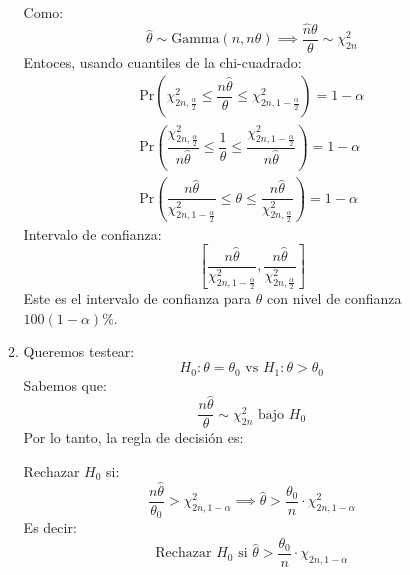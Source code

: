 \begin{enumerate}[label=\color{red}\textbf{\arabic*)}]
\begin{enumerate}[label=\color{red}\textbf{\alph*)}]
            Como: \[
            \hat{\theta}\sim \text{Gamma}(n,n\theta)\implies \dfrac{\hat{n}\theta}{\theta}\sim \chi_{2n}^2
            \] 
            Entoces, usando cuantiles de la chi-cuadrado: \[
\begin{array}{c}
            \mathrm{Pr}\left( \chi_{2n,\frac{\alpha}{2} }^2\le \dfrac{n \hat{\theta}}{\theta}\le \chi_{2n,1-\frac{\alpha}{2} }^2 \right) =1-\alpha\\
            \mathrm{Pr}\left( \dfrac{\chi_{2n,\frac{\alpha}{2} }^2}{n \hat{\theta}}\le \dfrac{1}{\theta}\le \dfrac{\chi_{2n,1-\frac{\alpha}{2} }^2}{n \hat{\theta}} \right) =1-\alpha\\
            \mathrm{Pr}\left( \dfrac{n \hat{\theta}}{\chi_{2n,1-\frac{\alpha}{2}}^2} \le \theta\le \dfrac{n \hat{\theta}}{\chi_{2n,\frac{\alpha}{2} }^2} \right) =1-\alpha
\end{array}
            \] 
            Intervalo de confianza: \[
            \left[ \dfrac{n \hat{\theta}}{\chi_{2n,1-\frac{\alpha}{2}}^2},\dfrac{n \hat{\theta}}{\chi_{2n,\frac{\alpha}{2}}^2} \right] 
            \] 
            Este es el intervalo de confianza para $\theta$ con nivel de confianza  $100(1-\alpha)\%$.
        \item {} 
        Queremos testear: \[
        H_0:\theta=\theta_0\text{ vs }H_1:\theta>\theta_0
        \] 
        Sabemos que: \[
        \dfrac{n \hat{\theta}}{\theta}\sim \chi_{2n}^2\text{ bajo }H_0
        \] 
        Por lo tanto, la regla de decisión es:

        Rechazar $H_0$ si: \[
        \dfrac{n \hat{\theta}}{\theta_0}>\chi_{2n,1-\alpha}^2\implies \hat{\theta}>\dfrac{\theta_0}{n}\cdot \chi_{2n,1-\alpha}^2
        \] 
        Es decir: \[
        \text{Rechazar $H_0$ si }\hat{\theta}>\dfrac{\theta_0}{n}\cdot \chi_{2n,1-\alpha}
        \] 
    \end{enumerate}
\end{enumerate}

